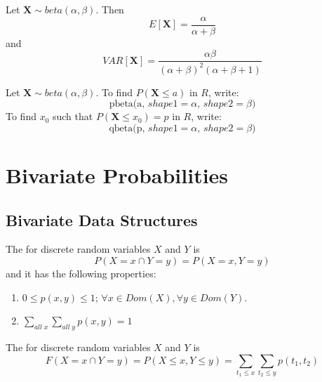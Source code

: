 \documentclass[12pt]{report}
\begin{document}
\begin{defn}{}{}
    Let $\mathbf{X}\sim beta(\alpha,\beta)$. Then \begin{equation*}
        E[\mathbf{X}] = \frac{\alpha}{\alpha+\beta}
    \end{equation*}
    and
    \begin{equation*}
        VAR[\mathbf{X}] = \frac{\alpha\beta}{(\alpha+\beta)^2(\alpha+\beta+1)}
    \end{equation*}
\end{defn}



\begin{defn}{}{}
    Let $\mathbf{X}\sim beta(\alpha,\beta)$. To find $P(\mathbf{X} \leq a)$ in $R$, write: \begin{equation*}
        \text{pbeta(a, $shape1 = \alpha$, $shape2 = \beta$)}
    \end{equation*}
    To find $x_0$ such that $P(\mathbf{X} \leq x_0) = p$ in $R$, write: \begin{equation*}
        \text{qbeta(p, $shape1 = \alpha$, $shape2 = \beta$)}
    \end{equation*}
\end{defn}

\chapter{Bivariate Probabilities}

\section{Bivariate Data Structures}

\begin{defn}{}{}
    The  for discrete random variables $X$ and $Y$ is \begin{equation*}
        P(X = x\cap Y = y) = P(X = x, Y = y)
    \end{equation*}
    and it has the following properties: \begin{enumerate}
        \item $0 \leq p(x,y) \leq 1$; $\forall x \in Dom(X), \forall y \in Dom(Y)$.
        \item $\sum\limits_{all\;x}\sum\limits_{all\;y}p(x,y) = 1$
    \end{enumerate}
\end{defn}

\begin{defn}{}{}
    The  for discrete random variables $X$ and $Y$ is \begin{equation*}
        F(X = x\cap Y = y) = P(X \leq x, Y \leq y) = \sum\limits_{t_1\leq x}\sum\limits_{t_2\leq y}p(t_1,t_2)
    \end{equation*}
\end{defn}
\end{document}
